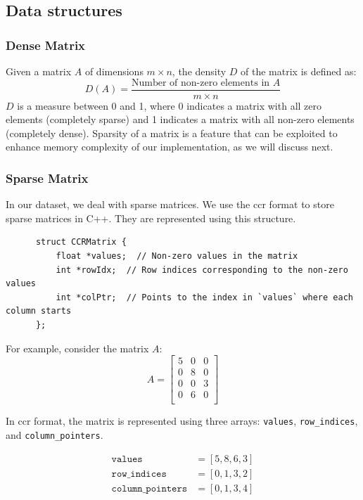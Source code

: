 \subsection{Data structures}

\subsubsection{Dense Matrix}
Given a matrix \( A \) of dimensions \( m \times n \), the density \( D \) of
the matrix is defined as:
\[
    D(A) = \frac{\text{Number of non-zero elements in } A}{m \times n}
\]
$D$ is a measure between 0 and 1, where 0 indicates a
matrix with all zero elements (completely sparse)
and 1 indicates a matrix with all non-zero elements (completely dense).
Sparsity of a matrix is a feature that can be exploited to
enhance memory complexity of our implementation, as we will discuss next.

\subsubsection{Sparse Matrix}\label{subsubsection:sparse-matrix}
In our dataset, we deal with sparse matrices.
We use the \gls{ccr} format to store sparse matrices in C++. They are represented using this
structure.

\begin{verbatim}
      struct CCRMatrix {
          float *values;  // Non-zero values in the matrix
          int *rowIdx;  // Row indices corresponding to the non-zero values
          int *colPtr;  // Points to the index in `values` where each column starts
      };
\end{verbatim}

For example, consider the matrix \( A \):
\[
    A =
    \begin{bmatrix}
        5 & 0 & 0 \\
        0 & 8 & 0 \\
        0 & 0 & 3 \\
        0 & 6 & 0 \\
    \end{bmatrix}
\]

In \gls{ccr} format, the matrix is represented using three arrays:
\texttt{values}, \texttt{row\_indices}, and \texttt{column\_pointers}.

\begin{align*}
    \texttt{values}           & = [5, 8, 6, 3] \\
    \texttt{row\_indices}     & = [0, 1, 3, 2] \\
    \texttt{column\_pointers} & = [0, 1, 3, 4] \\
\end{align*}
